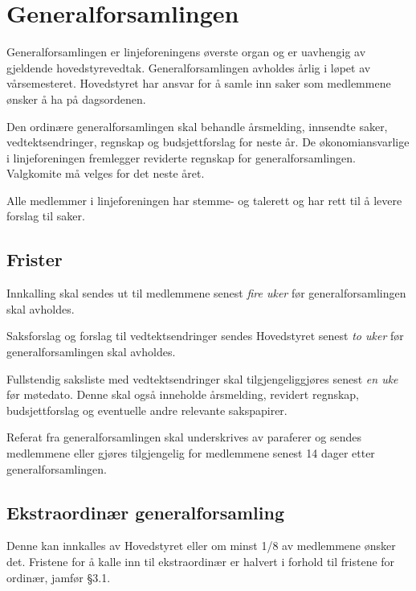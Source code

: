 \chapter{Generalforsamlingen}

Generalforsamlingen er linjeforeningens øverste organ og er uavhengig av gjeldende hovedstyrevedtak. Generalforsamlingen avholdes årlig i løpet av vårsemesteret. Hovedstyret har ansvar for å samle inn saker som medlemmene ønsker å ha på \mbox{dagsordenen}. \newline

Den ordinære generalforsamlingen skal behandle årsmelding, innsendte saker, \linebreak vedtektsendringer, regnskap og budsjettforslag for neste år. De økonomiansvarlige i linjeforeningen fremlegger reviderte regnskap for generalforsamlingen. Valgkomite må velges for det neste året. \newline

Alle medlemmer i linjeforeningen har stemme- og talerett og har rett til å levere forslag til saker.

\section{Frister}
\label{sec:frister}
\begin{liste}
	\item Innkalling skal sendes ut til medlemmene senest \emph{fire uker} før \mbox{generalforsamlingen} skal avholdes.
	\item Saksforslag og forslag til vedtektsendringer sendes Hovedstyret senest \emph{to uker} før generalforsamlingen skal avholdes.
	\item Fullstendig saksliste med vedtektsendringer skal tilgjengeliggjøres senest \emph{en uke} før møtedato. Denne skal også inneholde årsmelding, revidert regnskap, budsjettforslag og eventuelle andre relevante sakspapirer.
	\item Referat fra generalforsamlingen skal underskrives av paraferer og sendes \linebreak medlemmene eller gjøres tilgjengelig for medlemmene senest 14 dager etter generalforsamlingen.
\end{liste}


\section{Ekstraordinær generalforsamling}
Denne kan innkalles av Hovedstyret eller om minst 1/8 av medlemmene ønsker det. Fristene for å kalle inn til ekstraordinær er halvert i forhold til fristene for ordinær, jamfør §3.1. 

